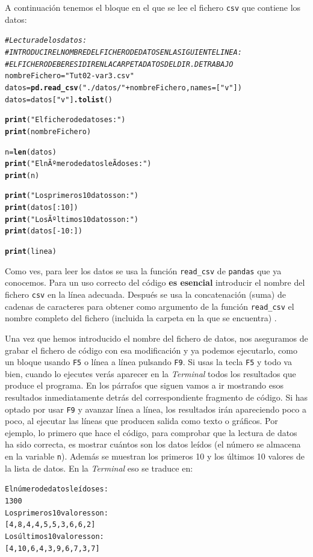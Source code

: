 \documentclass[10pt,a4paper]{article}\usepackage[]{graphicx}\usepackage[]{color}
\makeatletter
\newcommand{\hlstr}[1]{\textcolor[rgb]{0.192,0.494,0.8}{#1}}%
\newcommand{\hlcom}[1]{\textcolor[rgb]{0.678,0.584,0.686}{\textit{#1}}}%
\newcommand{\hlkwd}[1]{\textcolor[rgb]{0.737,0.353,0.396}{\textbf{#1}}}%
\newenvironment{kframe}{%
 \def\at@end@of@kframe{}%
 \ifinner\ifhmode%
  \def\at@end@of@kframe{\end{minipage}}%
  \begin{minipage}{\columnwidth}%
 \fi\fi%
 \def\FrameCommand##1{\hskip\@totalleftmargin \hskip-\fboxsep
 \colorbox{shadecolor}{##1}\hskip-\fboxsep
     \hskip-\linewidth \hskip-\@totalleftmargin \hskip\columnwidth}%
 \MakeFramed {\advance\hsize-\width
   \@totalleftmargin\z@ \linewidth\hsize
   \@setminipage}}%
 {\par\unskip\endMakeFramed%
 \at@end@of@kframe}
\newenvironment{knitrout}{}{} %
\newcounter {cont01}
\makeatother
\begin{document}
A continuación tenemos el bloque en el que se lee el fichero {\tt csv} que contiene los datos:
\begin{knitrout}
\color{fgcolor}\begin{kframe}
\begin{alltt}
\hlcom{# Lectura de los datos:}
\hlcom{# INTRODUCIR EL NOMBRE DEL FICHERO DE DATOS EN LA SIGUIENTE LINEA:}
\hlcom{# EL FICHERO DEBE RESIDIR EN LA CARPETA DATOS DEL DIR. DE TRABAJO}
nombreFichero = \hlstr{"Tut02-var3.csv"}
datos = \hlkwd{pd.read_csv}(\hlstr{"./datos/"} + nombreFichero, names=[\hlstr{"v"}])
datos = datos[\hlstr{"v"}]\hlkwd{.tolist}()

\hlkwd{print}(\hlstr{"El fichero de datos es:"})
\hlkwd{print}(nombreFichero)

n = \hlkwd{len}(datos)
\hlkwd{print}(\hlstr{"El nÃºmero de datos leÃ­dos es:"})
\hlkwd{print}(n)

\hlkwd{print}(\hlstr{"Los primeros 10 datos son:"})
\hlkwd{print}(datos[:10])
\hlkwd{print}(\hlstr{"Los Ãºltimos 10 datos son:"})
\hlkwd{print}(datos[-10:])

\hlkwd{print}(linea)
\end{alltt}
\end{kframe}
\end{knitrout}
Como ves, para leer los datos se usa la función \verb&read_csv& de {\tt pandas} que ya conocemos. Para un uso correcto del código {\bf es esencial} introducir el nombre del fichero {\tt csv} en la línea adecuada. Después se usa la concatenación (suma) de cadenas de caracteres para obtener como argumento de la función \verb&read_csv& el nombre completo del fichero (incluida la carpeta en la que se encuentra) .

Una vez que hemos introducido el nombre del fichero de datos, nos aseguramos de grabar el fichero de código con esa modificación y ya podemos ejecutarlo, como un bloque usando {\tt F5} o línea a línea pulsando {\tt F9}. Si usas la tecla {\tt F5} y todo va bien, cuando lo ejecutes verás aparecer en la {\em Terminal} todos los resultados que produce el programa. En los párrafos que siguen vamos a ir mostrando esos resultados inmediatamente detrás del correspondiente fragmento de código. Si has optado por usar {\tt F9} y avanzar línea a línea, los resultados irán apareciendo poco a poco, al ejecutar las líneas que producen salida como texto o gráficos. Por ejemplo, lo primero que hace el código, para comprobar que la lectura de datos ha sido correcta, es mostrar cuántos son los datos leídos (el número se almacena en la variable {\tt n}). Además se muestran los primeros 10 y los últimos 10 valores de la lista de datos. En la {\em Terminal} eso se traduce en:
\begin{knitrout}
\color{fgcolor}\begin{kframe}
\begin{alltt}
El número de datos leídos es:
1300
Los primeros 10 valores son:
[4, 8, 4, 4, 5, 5, 3, 6, 6, 2]
Los últimos 10 valores son:
[4, 10, 6, 4, 3, 9, 6, 7, 3, 7]
\end{alltt}
\end{kframe}
\end{knitrout}
\end{document}
